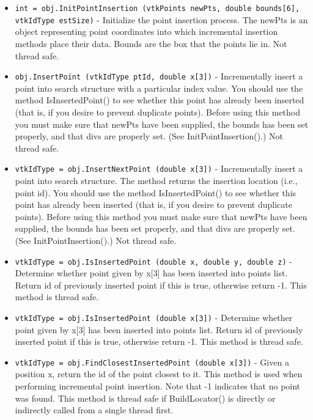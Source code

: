 \begin{itemize}
\item  \verb|int = obj.InitPointInsertion (vtkPoints newPts, double bounds[6], vtkIdType estSize)| -  Initialize the point insertion process. The newPts is an object
 representing point coordinates into which incremental insertion methods
 place their data. Bounds are the box that the points lie in.
 Not thread safe.

\item  \verb|obj.InsertPoint (vtkIdType ptId, double x[3])| -  Incrementally insert a point into search structure with a particular
 index value. You should use the method IsInsertedPoint() to see whether 
 this point has already been inserted (that is, if you desire to prevent
 duplicate points). Before using this method you must make sure that 
 newPts have been supplied, the bounds has been set properly, and that 
 divs are properly set. (See InitPointInsertion().)
 Not thread safe.

\item  \verb|vtkIdType = obj.InsertNextPoint (double x[3])| -  Incrementally insert a point into search structure. The method returns
 the insertion location (i.e., point id). You should use the method 
 IsInsertedPoint() to see whether this point has already been
 inserted (that is, if you desire to prevent duplicate points).
 Before using this method you must make sure that newPts have been
 supplied, the bounds has been set properly, and that divs are 
 properly set. (See InitPointInsertion().)
 Not thread safe.

\item  \verb|vtkIdType = obj.IsInsertedPoint (double x, double y, double z)| -  Determine whether point given by x[3] has been inserted into points list.
 Return id of previously inserted point if this is true, otherwise return
 -1. This method is thread safe.

\item  \verb|vtkIdType = obj.IsInsertedPoint (double x[3])| -  Determine whether point given by x[3] has been inserted into points list.
 Return id of previously inserted point if this is true, otherwise return
 -1. This method is thread safe.

\item  \verb|vtkIdType = obj.FindClosestInsertedPoint (double x[3])| -  Given a position x, return the id of the point closest to it. This method
 is used when performing incremental point insertion. Note that -1 
 indicates that no point was found.
 This method is thread safe if  BuildLocator() is directly or
 indirectly called from a single thread first.


\end{itemize}
